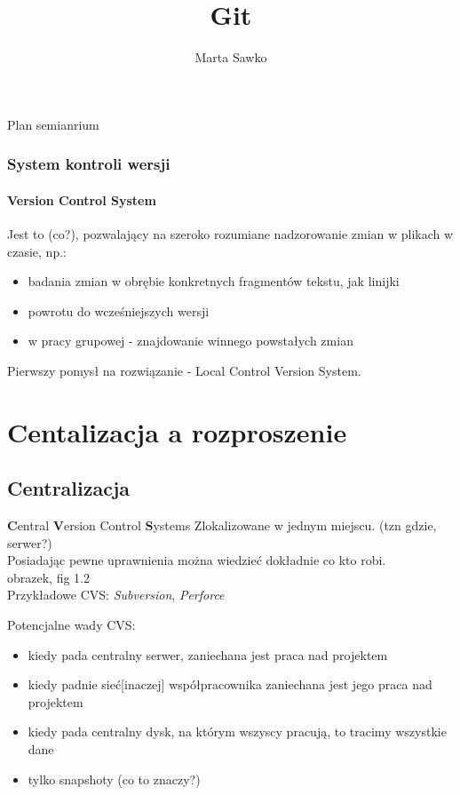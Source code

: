 \documentclass{beamer}
\title{Git}
\author{Marta Sawko}
\begin{document}
\frame{\titlepage}
\begin{frame}{Plan semianrium}
  \tableofcontents
\end{frame}

\begin{frame}
 \frametitle{System kontroli wersji}
 \framesubtitle{\textbf{V}ersion \textbf{C}ontrol \textbf{S}ystem}
 Jest to (co?), pozwalający na szeroko rozumiane nadzorowanie zmian w plikach w czasie, np.:
 \begin{itemize}
  \item badania zmian w obrębie konkretnych fragmentów tekstu, jak linijki
  \item powrotu do wcześniejszych wersji 
  \item w pracy grupowej - znajdowanie winnego powstałych zmian
 \end{itemize} 
 Pierwszy pomysł na rozwiązanie - Local Control Version System.
\end{frame}

\section{Centalizacja a rozproszenie}
\subsection{Centralizacja}
\begin{frame}{\textbf{C}entral \textbf{V}ersion Control \textbf{S}ystems}
  Zlokalizowane w jednym miejscu. (tzn gdzie, serwer?) \\
  Posiadając pewne uprawnienia można wiedzieć dokładnie co kto robi.\\
  obrazek, fig 1.2
  \\ Przykładowe CVS\@: \textit{Subversion}, \textit{Perforce}
\end{frame}

\begin{frame}
  Potencjalne wady CVS:\@
  \begin{itemize}
  \item kiedy pada centralny serwer, zaniechana jest praca nad projektem
  \item kiedy padnie sieć[inaczej] współpracownika zaniechana jest jego praca nad projektem
  \item kiedy pada centralny dysk, na którym wszyscy pracują, to tracimy wszystkie dane 
  \item tylko snapshoty (co to znaczy?)
 \end{itemize}
\end{frame}
\end{document}

